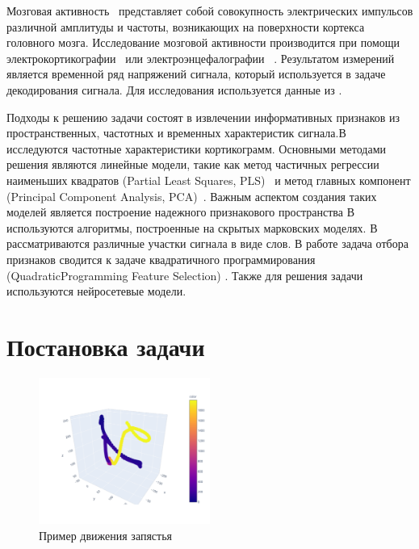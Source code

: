 \documentclass[12pt, twoside]{article}
\begin{document}
Мозговая активность~\cite{motrenko2018multi} представляет собой совокупность электрических импульсов различной амплитуды и частоты, возникающих на поверхности кортекса головного мозга. Исследование мозговой активности производится при помощи  электрокортикографии~\cite{hill2012recording} или  электроэнцефалографии~ \cite{aminoff2012electroencephalography}. Результатом измерений является временной ряд напряжений сигнала, который используется в задаче декодирования сигнала. Для исследования используется данные из \cite{chao2010long}.

 Подходы \cite{morishita2014brain, alexander2013traveling} к решению задачи состоят в извлечении информативных признаков из пространственных, частотных и временных характеристик сигнала.В~\cite{chin2007identification, eliseyev2014stable, loza2017unsupervised} исследуются частотные характеристики кортикограмм. Основными методами решения являются линейные модели, такие как метод частичных регрессии наименьших  квадратов (Partial Least Squares, PLS)~\cite{eliseyev2014stable,eliseyev2016penalized, rosipal2005overview} и метод главных компонент (Principal Component Analysis, PCA)~\cite{rosipal2005overview, eliseyev2016penalized}.
 Важным аспектом создания таких моделей является построение надежного
 признакового пространства
  В~\cite{zhao2014coupled} используются алгоритмы, построенные на скрытых марковских моделях. В~\cite{loza2017unsupervised, zhao2010ecog} рассматриваются различные участки сигнала в виде слов. В работе \cite{motrenko2018multi} задача отбора признаков сводится к задаче квадратичного программирования (QuadraticProgramming Feature Selection) \cite{rodriguez2010quadratic}. Также для решения задачи используются нейросетевые модели\cite{xie2018deep}. 
\newpage
\section{Постановка задачи}
\begin{figure}[]
	\centering
  	\includegraphics[width=0.5\textwidth]{newplot.pdf}
  	\caption{Пример движения запястья}
\end{figure}
\end{document}
